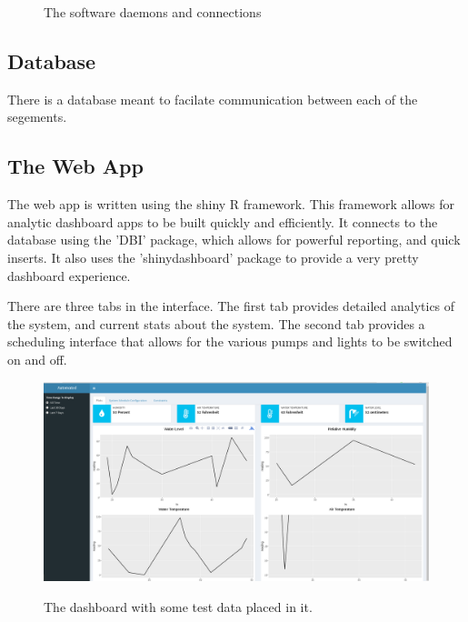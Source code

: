 \documentclass[american,12pt]{article}
\begin{document}
\begin{figure}[h]
    \centering
    \caption{The software daemons and connections}
    \label{fig:Software Architecture}
\end{figure}

\subsection{Database}
There is a database meant to facilate communication between each of the segements.

\subsection{The Web App}
The web app is written using the shiny R framework. This framework allows for 
analytic dashboard apps to be built quickly and efficiently. It connects to
the database using the 'DBI' package, which allows for powerful reporting, and
quick inserts. It also uses the 'shinydashboard' package to provide a very
pretty dashboard experience.

There are three tabs in the interface. The first tab provides detailed
analytics of the system, and current stats about the system. The second
tab provides a scheduling interface that allows for the various pumps
and lights to be switched on and off. 

\begin{figure}[h]
	\includegraphics[width=\linewidth]{imgs/WebappDashboard}
	\label{fig:data dashboard}
	\caption{The dashboard with some test data placed in it.}
\end{figure}
\end{document}
